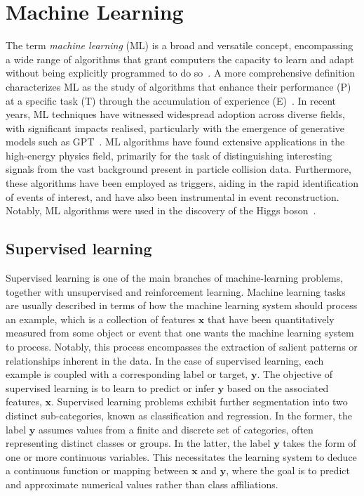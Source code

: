 \chapter{Machine Learning}

The term \emph{machine learning} (ML) is a broad and versatile concept, encompassing a wide range of algorithms that grant computers the capacity to learn and adapt without being explicitly programmed to do so~\cite{5392560}. A more comprehensive definition characterizes ML as the study of algorithms that enhance their performance (P) at a specific task (T) through the accumulation of experience (E)~\cite{mitchell1997machine}. In recent years, ML techniques have witnessed widespread adoption across diverse fields, with significant impacts realised, particularly with the emergence of generative models such as GPT~\cite{openai2023gpt4}.
ML algorithms have found extensive applications in the high-energy physics field, primarily for the task of distinguishing interesting signals from the vast background present in particle collision data. Furthermore, these algorithms have been employed as triggers, aiding in the rapid identification of events of interest, and have also been instrumental in event reconstruction. Notably, ML algorithms were used in the discovery of the Higgs boson~\cite{CMS:2012qbp}.

\section{Supervised learning}
Supervised learning is one of the main branches of machine-learning problems, together with unsupervised and reinforcement learning. Machine learning tasks are usually described in terms of how the machine learning system should process an example, which is a collection of features $\mathbf{x}$ that have been quantitatively measured from some object or event that one wants the machine learning system to process.  Notably, this process encompasses the extraction of salient patterns or relationships inherent in the data. In the case of supervised learning, each example is coupled with a corresponding label or target, $\mathbf{y}$. The objective of supervised learning is to learn to predict or infer $\mathbf{y}$ based on the associated features, $\mathbf{x}$.
Supervised learning problems exhibit further segmentation into two distinct sub-categories, known as classification and regression. In the former, the label $\mathbf{y}$ assumes values from a finite and discrete set of categories, often representing distinct classes or groups. In the latter, the label $\mathbf{y}$ takes the form of one or more continuous variables. This necessitates the learning system to deduce a continuous function or mapping between $\mathbf{x}$ and $\mathbf{y}$, where the goal is to predict and approximate numerical values rather than class affiliations.


